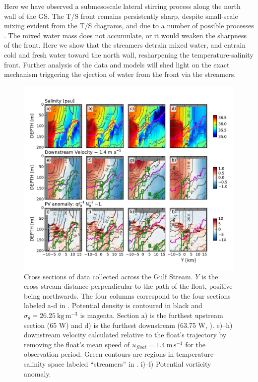 \documentclass[draft,grl]{agutex2015}
\begin{document}
\begin{article}
Here we have observed a submesoscale lateral stirring process along the north wall of the GS.  The T/S front remains persistently sharp, despite small-scale mixing evident from the T/S diagrams, and due to a number of possible processes  \citep{thomasshakespeare15,whittthomas13}. The mixed water mass does not accumulate, or it would weaken the sharpness of the front. Here we show that the streamers detrain mixed water, and entrain cold and fresh water toward the north wall, resharpening the temperature-salinity front. Further analysis of the data and models will shed light on the exact mechanism triggering the ejection of water from the front via the streamers.

\begin{figure}[htbp]
  \centering
    \includegraphics[width=\textwidth]{./SalDFirstStreamer.pdf}
    \caption{Cross sections of data collected across the Gulf Stream.   $Y$ is the cross-stream distance perpendicular to the path of the float, positive being northwards.  The four columns correspond to the  four sections labeled a-d in . Potential density is contoured in black and $\sigma_{\theta}=26.25\ \mathrm{kg\,m^{-3}}$ is magenta.  Section a) is the furthest upstream section (65 W) and d) is the furthest downstream (63.75 W, ).  e)--h) downstream velocity calculated relative to the float's trajectory by removing the float's mean speed of $u_{float}=1.4\ \mathrm{m\,s^{-1}}$ for the observation period.   Green contours are regions in temperature-salinity space labeled ``streamers'' in .  i)--l) Potential vorticity anomaly.  
 } \label{fig:SalDFirstStreamer}
\end{figure}


\end{article}
\end{document}
